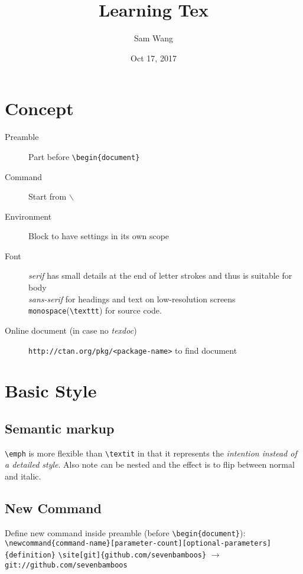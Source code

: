 \documentclass{article}
\title{Learning Tex}
\author{Sam Wang}
\date{Oct 17, 2017}
\newcommand{\site}[2][protocol]{\texttt{#1://#2}}
\begin{document}
\section{Concept}
\begin{description}
\item[Preamble]Part before \verb|\begin{document}|
\item[Command]Start from $\backslash$
\item[Environment]Block to have settings in its own scope
\item[Font]\emph{serif} has small details at the end of letter strokes and thus is suitable for body
\\ \emph{sans-serif} for headings and text on low-resolution screens
\\ \texttt{monospace}(\verb|\texttt|) for source code. 
\item[Online document (in case no \emph{texdoc})]\site[http]{ctan.org/pkg/<package-name>} to find document
\end{description}

\section{Basic Style}
\subsection{Semantic markup}

\verb|\emph| is more flexible than \verb|\textit| in that it represents the \emph{\emph{intention} instead of a detailed style}.
Also note \emph can be nested and the effect is to flip between normal and italic.

\subsection{New Command}
Define new command inside preamble (before \verb|\begin{document}|):
\\ \verb|\newcommand{command-name}[parameter-count][optional-parameters]{definition}|
\verb|\site[git]{github.com/sevenbamboos}| $\rightarrow$ \site[git]{github.com/sevenbamboos}
\end{document}
